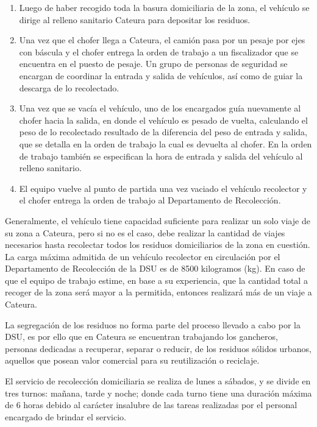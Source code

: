\begin{enumerate}
\item Luego de haber recogido toda la basura domiciliaria de la zona, el vehículo se dirige al relleno sanitario Cateura para depositar los residuos. 
\item Una vez que el chofer llega a Cateura, el camión pasa por un pesaje por ejes con báscula y el chofer entrega la orden de trabajo a un fiscalizador que se encuentra en el puesto de pesaje. Un grupo de personas de seguridad se encargan de coordinar la entrada y salida de vehículos, así como de guiar la descarga de lo recolectado. 
\item Una vez que se vacía el vehículo, uno de los encargados guía nuevamente al chofer hacia la salida, en donde el vehículo es pesado de vuelta, calculando el peso de lo recolectado resultado de la diferencia del peso de entrada y salida, que se detalla en la orden de trabajo la cual es devuelta al chofer. En la orden de trabajo también se especifican la hora de entrada y salida del vehículo al relleno sanitario.
\item El equipo vuelve al punto de partida una vez vaciado el vehículo recolector y el chofer entrega la orden de trabajo al Departamento de Recolección.  
\end{enumerate}

Generalmente, el vehículo tiene capacidad suficiente para realizar un solo viaje de su zona a Cateura, pero si no es el caso, debe realizar la cantidad de viajes necesarios hasta recolectar todos los residuos domiciliarios de la zona en cuestión. La carga máxima admitida de un vehículo recolector en circulación por el Departamento de Recolección de la DSU es de 8500 kilogramos (kg). En caso de que el equipo de trabajo estime, en base a su experiencia, que la cantidad total a recoger de la zona será mayor a la permitida, entonces realizará más de un viaje a Cateura.

La segregación de los residuos no forma parte del proceso llevado a cabo por la DSU, es por ello que en Cateura se encuentran trabajando los gancheros, personas dedicadas a recuperar, separar o reducir, de los residuos sólidos urbanos, aquellos que posean valor comercial para su reutilización o reciclaje.

El servicio de recolección domiciliaria se realiza de lunes a sábados, y se divide en tres turnos: mañana, tarde y noche; donde cada turno tiene una duración máxima de 6 horas debido al carácter insalubre de las tareas realizadas por el personal encargado de brindar el servicio.

